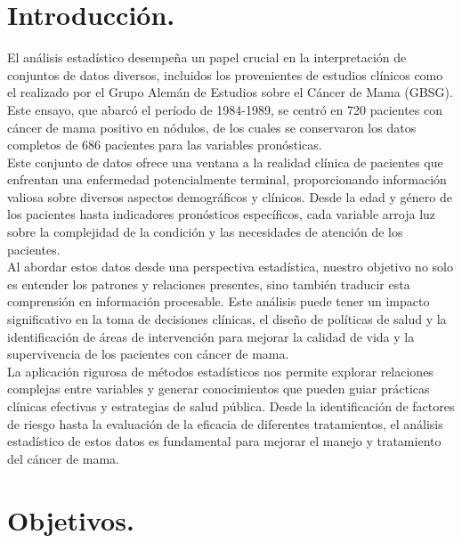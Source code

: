 \documentclass[10pt,a4paper]{article}
\begin{document}
\date{} 

\justify
\setlength{\parindent}{0cm}



\tableofcontents
\newpage


\listoftables
\newpage

\listoffigures
\newpage

\newpage
\section{Introducción.}
El análisis estadístico desempeña un papel crucial en la interpretación de conjuntos de datos diversos, incluidos los provenientes de estudios clínicos como el realizado por el Grupo Alemán de Estudios sobre el Cáncer de Mama (GBSG). Este ensayo, que abarcó el período de 1984-1989, se centró en 720 pacientes con cáncer de mama positivo en nódulos, de los cuales se conservaron los datos completos de 686 pacientes para las variables pronósticas.
\\
Este conjunto de datos ofrece una ventana a la realidad clínica de pacientes que enfrentan una enfermedad potencialmente terminal, proporcionando información valiosa sobre diversos aspectos demográficos y clínicos. Desde la edad y género de los pacientes hasta indicadores pronósticos específicos, cada variable arroja luz sobre la complejidad de la condición y las necesidades de atención de los pacientes.
\\
Al abordar estos datos desde una perspectiva estadística, nuestro objetivo no solo es entender los patrones y relaciones presentes, sino también traducir esta comprensión en información procesable. Este análisis puede tener un impacto significativo en la toma de decisiones clínicas, el diseño de políticas de salud y la identificación de áreas de intervención para mejorar la calidad de vida y la supervivencia de los pacientes con cáncer de mama.
\\
La aplicación rigurosa de métodos estadísticos nos permite explorar relaciones complejas entre variables y generar conocimientos que pueden guiar prácticas clínicas efectivas y estrategias de salud pública. Desde la identificación de factores de riesgo hasta la evaluación de la eficacia de diferentes tratamientos, el análisis estadístico de estos datos es fundamental para mejorar el manejo y tratamiento del cáncer de mama.
\newpage
\section{Objetivos.}
\end{document}
